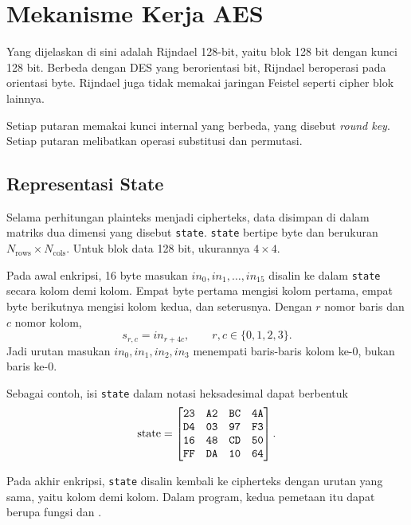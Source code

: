 \section{Mekanisme Kerja AES}
\label{sec:mekanisme-aes}

Yang dijelaskan di sini adalah Rijndael 128-bit, yaitu blok 128 bit dengan kunci
128 bit. Berbeda dengan DES yang berorientasi bit, Rijndael beroperasi pada
orientasi byte. Rijndael juga tidak memakai jaringan Feistel seperti cipher blok
lainnya.

Setiap putaran memakai kunci internal yang berbeda, yang disebut
\textit{round key}. Setiap putaran melibatkan operasi substitusi dan permutasi.

\subsection{Representasi State}

Selama perhitungan plainteks menjadi cipherteks, data disimpan di dalam matriks dua
dimensi yang disebut \texttt{state}. \texttt{state} bertipe byte dan berukuran
$N_{\text{rows}} \times N_{\text{cols}}$. Untuk blok data 128 bit, ukurannya
$4 \times 4$.

Pada awal enkripsi, 16 byte masukan $in_0, in_1, \dots, in_{15}$ disalin ke dalam
\texttt{state} secara kolom demi kolom. Empat byte pertama mengisi kolom pertama,
empat byte berikutnya mengisi kolom kedua, dan seterusnya. Dengan $r$ nomor baris
dan $c$ nomor kolom,
\begin{equation}
s_{r,c} = in_{r + 4c}, \qquad r, c \in \{0,1,2,3\}.
\label{eq:aes-state}
\end{equation}
Jadi urutan masukan $in_0, in_1, in_2, in_3$ menempati baris-baris kolom ke-0,
bukan baris ke-0.

Sebagai contoh, isi \texttt{state} dalam notasi heksadesimal dapat berbentuk
\[
\text{state} =
\begin{bmatrix}
\texttt{23} & \texttt{A2} & \texttt{BC} & \texttt{4A} \\
\texttt{D4} & \texttt{03} & \texttt{97} & \texttt{F3} \\
\texttt{16} & \texttt{48} & \texttt{CD} & \texttt{50} \\
\texttt{FF} & \texttt{DA} & \texttt{10} & \texttt{64}
\end{bmatrix}.
\]

Pada akhir enkripsi, \texttt{state} disalin kembali ke cipherteks dengan urutan
yang sama, yaitu kolom demi kolom. Dalam program, kedua pemetaan itu dapat berupa
fungsi  dan .


